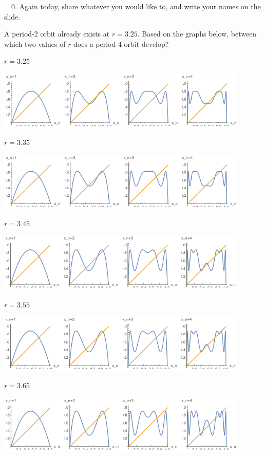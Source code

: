\documentclass[12pt,letterpaper,noanswers]{exam}
\begin{document}
\noindent \ \ 0.  Again today, share whatever you would like to, and write your names on the slide.

\begin{questions}

\question 
\begin{parts}
\item A period-2 orbit already exists at $r = 3.25$.  Based on the graphs below, between which two values of $r$ does a period-4 orbit develop?

$r = 3.25$

\includegraphics[width=0.9\textwidth]{img/C25-3-25-p1a.png}

$r = 3.35$

\includegraphics[width=0.9\textwidth]{img/C25-3-35-p1b.png}

$r = 3.45$

\includegraphics[width=0.9\textwidth]{img/C25-3-45-p1c.png}

$r = 3.55$

\includegraphics[width=0.9\textwidth]{img/C25-3-55-p1d.png}

$r = 3.65$

\includegraphics[width=0.9\textwidth]{img/C25-3-65-p1e.png}


\end{parts}
\end{questions}
\end{document}
